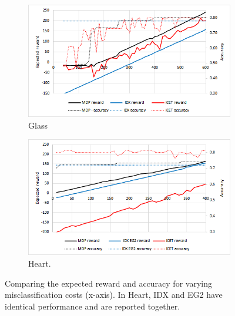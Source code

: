\documentclass[letterpaper]{article}
\theoremstyle{definition}
\begin{document}
\begin{figure}[!ht]
	\centering
	\begin{subfigure}[t]{0.5\textwidth}\vskip 0pt
		\centering
		\includegraphics[scale=0.55]{Glass}
		\caption{Glass}\label{fig:Glass}		
	\end{subfigure}
    \quad
    
	\begin{subfigure}[t]{0.5\textwidth}\vskip 0pt
		\centering
		\includegraphics[scale=0.55]{Heart}
		\caption{Heart.}\label{fig:Heart}
	\end{subfigure}

    \caption{Comparing the expected reward and accuracy for varying misclassification costs (x-axis). In Heart, IDX and EG2 have identical performance and are reported together.}
    \label{fig:RewardVsAccuracy}
\end{figure}
\end{document}

